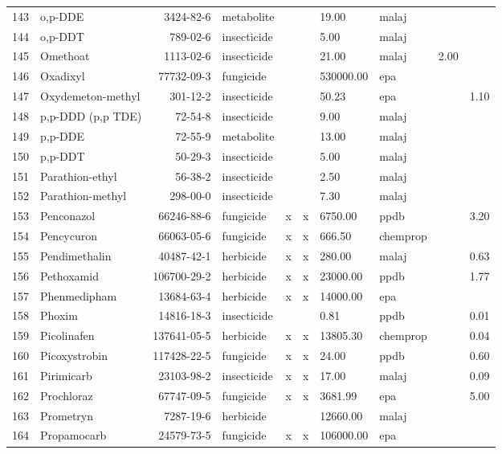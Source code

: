 \begin{longtable}{lp{3cm}rlp{0.5cm}p{0.5cm}p{1.5cm}p{1cm}p{1cm}p{1cm}}
  143 & o,p-DDE & 3424-82-6 & metabolite &  &  & 19.00 & malaj &  &  \\ 
  144 & o,p-DDT & 789-02-6 & insecticide &  &  & 5.00 & malaj &  &  \\ 
  145 & Omethoat & 1113-02-6 & insecticide &  &  & 21.00 & malaj & 2.00 &  \\ 
  146 & Oxadixyl & 77732-09-3 & fungicide &  &  & 530000.00 & epa &  &  \\ 
  147 & Oxydemeton-methyl & 301-12-2 & insecticide &  &  & 50.23 & epa &  & 1.10 \\ 
  148 & p,p-DDD (p,p TDE) & 72-54-8 & insecticide &  &  & 9.00 & malaj &  &  \\ 
  149 & p,p-DDE & 72-55-9 & metabolite &  &  & 13.00 & malaj &  &  \\ 
  150 & p,p-DDT & 50-29-3 & insecticide &  &  & 5.00 & malaj &  &  \\ 
  151 & Parathion-ethyl & 56-38-2 & insecticide &  &  & 2.50 & malaj &  &  \\ 
  152 & Parathion-methyl & 298-00-0 & insecticide &  &  & 7.30 & malaj &  &  \\ 
  153 & Penconazol & 66246-88-6 & fungicide & x & x & 6750.00 & ppdb &  & 3.20 \\ 
  154 & Pencycuron & 66063-05-6 & fungicide & x & x & 666.50 & chemprop &  &  \\ 
  155 & Pendimethalin & 40487-42-1 & herbicide & x & x & 280.00 & malaj &  & 0.63 \\ 
  156 & Pethoxamid & 106700-29-2 & herbicide & x & x & 23000.00 & ppdb &  & 1.77 \\ 
  157 & Phenmedipham & 13684-63-4 & herbicide & x & x & 14000.00 & epa &  &  \\ 
  158 & Phoxim & 14816-18-3 & insecticide &  &  & 0.81 & ppdb &  & 0.01 \\ 
  159 & Picolinafen & 137641-05-5 & herbicide & x & x & 13805.30 & chemprop &  & 0.04 \\ 
  160 & Picoxystrobin & 117428-22-5 & fungicide & x & x & 24.00 & ppdb &  & 0.60 \\ 
  161 & Pirimicarb & 23103-98-2 & insecticide & x & x & 17.00 & malaj &  & 0.09 \\ 
  162 & Prochloraz & 67747-09-5 & fungicide & x & x & 3681.99 & epa &  & 5.00 \\ 
  163 & Prometryn & 7287-19-6 & herbicide &  &  & 12660.00 & malaj &  &  \\ 
  164 & Propamocarb & 24579-73-5 & fungicide & x & x & 106000.00 & epa &  &  \\ 

\end{longtable}
